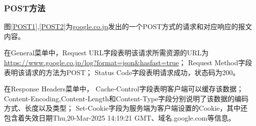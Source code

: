 \subsubsection{POST方法}
图\ref{POST1},\ref{POST2}为\url{google.co.jp}发出的一个POST方式的请求和对应响应的报文内容。

在General菜单中，Request URL字段表明该请求所需资源的URL为\url{https://www.google.co.jp/log?format=json&hasfast=true}；
Request Method字段表明该请求的方法为POST；
Status Code字段表明请求成功，状态码为200。

在Response Headers菜单中，
Cache-Control字段表明客户端可以缓存该数据；
Content-Encoding,Content-Length和Content-Type字段分别说明了该数据的编码方式、长度以及类型；
Set-Cookie字段为服务端为客户端设置的Cookie，其中还包含着失效日期Thu,20-Mar-2025 14:19:21 GMT、域名.google.com等信息。

